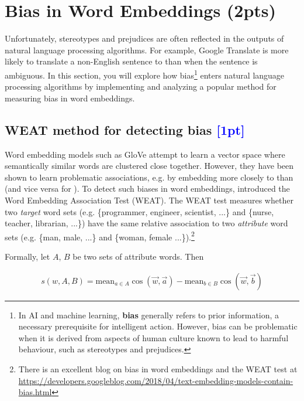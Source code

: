 \section{Bias in Word Embeddings (2pts)}

Unfortunately, stereotypes and prejudices are often reflected in the outputs of natural language processing algorithms. For example, Google Translate is more likely to translate a non-English sentence to  than  when the sentence is ambiguous. In this section, you will explore how bias\footnote{In AI and machine learning, \textbf{bias} generally refers to prior information, a necessary prerequisite for intelligent action. However, bias can be problematic when it is derived from aspects of human culture known to lead to harmful behaviour, such as stereotypes and prejudices.} enters natural language processing algorithms by implementing and analyzing a popular method for measuring bias in word embeddings.

\subsection{WEAT method for detecting bias \textcolor{blue}{[1pt]} \LII}

Word embedding models such as GloVe attempt to learn a vector space where semantically similar words are clustered close together. However, they have been shown to learn problematic associations, e.g. by embedding  more closely to  than  (and vice versa for ). To detect such biases in word embeddings, \cite{caliskan2017semantics} introduced the Word Embedding Association Test (WEAT). The WEAT test measures whether two \textit{target} word sets (e.g. \{programmer, engineer, scientist, ...\} and \{nurse, teacher, librarian, ...\}) have the same relative association to two \textit{attribute} word sets (e.g. \{man, male, ...\} and \{woman, female ...\}).\footnote{There is an excellent blog on bias in word embeddings and the WEAT test at \url{https://developers.googleblog.com/2018/04/text-embedding-models-contain-bias.html}}

Formally, let  \(A\), \(B\) be two sets of attribute words. Then

\begin{align}
  s(w, A, B) = \text{mean}_{a \in A} \cos(\vec{w}, \vec{a}) - \text{mean}_{b \in B} \cos(\vec{w}, \vec{b})
\end{align}


